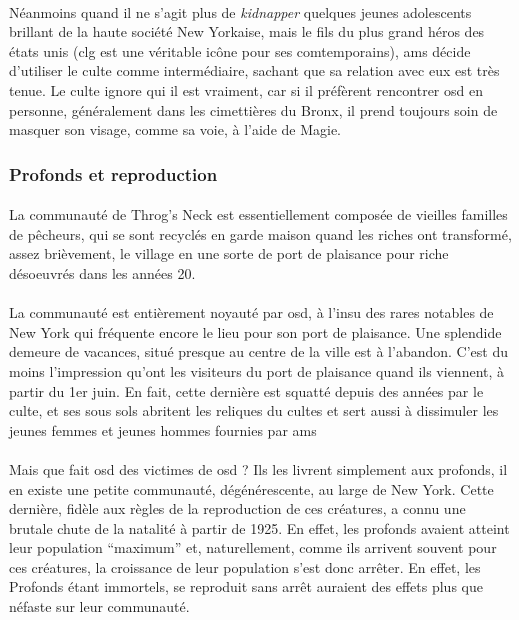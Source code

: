 \paragraph{} Néanmoins quand il ne s'agit plus de \emph{kidnapper} quelques jeunes adolescents brillant 
de la haute société New Yorkaise, mais le fils du plus grand héros des états unis (\gls{clg} est une véritable 
icône pour ses comtemporains), \gls{ams} décide d'utiliser le culte comme intermédiaire, sachant que sa 
relation avec eux est très tenue. Le culte ignore qui il est vraiment, car si il préfèrent rencontrer \gls{osd}
en personne, généralement dans les cimettières du Bronx, il prend toujours soin de masquer son visage, comme
sa voie, à l'aide de Magie.

\subsubsection{Profonds et reproduction}

\paragraph{} La communauté de Throg's Neck est essentiellement composée de vieilles familles de pêcheurs, 
qui se sont recyclés en garde maison quand les riches ont transformé, assez brièvement, le village en une
sorte de port de plaisance pour riche désoeuvrés dans les années 20.

\paragraph{} La communauté est entièrement noyauté par \gls{osd}, à l'insu des rares notables de New York qui
fréquente encore le lieu pour son port de plaisance. Une splendide demeure de vacances, situé presque au centre
de la ville est à l'abandon. C'est du moins l'impression qu'ont les visiteurs du port de plaisance quand ils
viennent, à partir du 1er juin. En fait, cette dernière est squatté depuis des années par le culte, et ses 
sous sols abritent les reliques du cultes et sert aussi à dissimuler les jeunes femmes et jeunes hommes 
fournies par \gls{ams}

\paragraph{} Mais que fait \gls{osd} des victimes de \gls{osd} ? Ils les livrent simplement aux profonds, il en 
existe une petite communauté, dégénérescente, au large de New York. Cette dernière, fidèle aux règles de la
reproduction de ces créatures, a connu une brutale chute de la natalité à partir de 1925. En effet, les 
profonds avaient atteint leur population ``maximum'' et, naturellement, comme ils arrivent souvent pour ces 
créatures, la croissance de leur population s'est donc arrêter. En effet, les Profonds étant immortels, se reproduit
sans arrêt auraient des effets plus que néfaste sur leur communauté.

